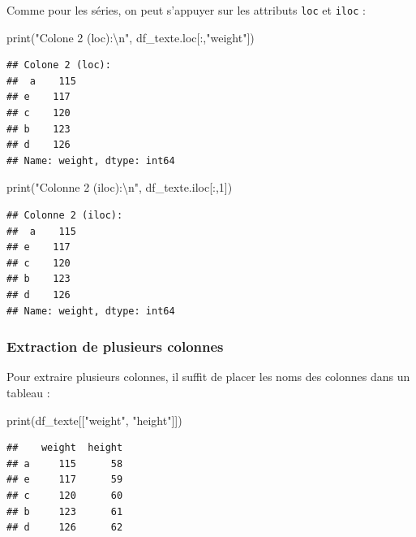 \documentclass[12pt,]{book}
\newenvironment{Shaded}{\begin{snugshade}}{\end{snugshade}}
\newcommand{\DecValTok}[1]{\textcolor[rgb]{0.00,0.00,0.81}{#1}}
\newcommand{\CharTok}[1]{\textcolor[rgb]{0.31,0.60,0.02}{#1}}
\newcommand{\StringTok}[1]{\textcolor[rgb]{0.31,0.60,0.02}{#1}}
\newcommand{\BuiltInTok}[1]{#1}
\newcommand{\NormalTok}[1]{#1}
\numberwithin{equation}{section}
\numberwithin{countremarque}{section}
\begin{document}
Comme pour les séries, on peut s'appuyer sur les attributs \texttt{loc}
et \texttt{iloc} :

\begin{Shaded}
\begin{Highlighting}[]
\BuiltInTok{print}\NormalTok{(}\StringTok{"Colone 2 (loc):}\CharTok{\textbackslash{}n}\StringTok{"}\NormalTok{, df_texte.loc[:,}\StringTok{"weight"}\NormalTok{])}
\end{Highlighting}
\end{Shaded}

\begin{lstlisting}
## Colone 2 (loc):
##  a    115
## e    117
## c    120
## b    123
## d    126
## Name: weight, dtype: int64
\end{lstlisting}

\begin{Shaded}
\begin{Highlighting}[]
\BuiltInTok{print}\NormalTok{(}\StringTok{"Colonne 2 (iloc):}\CharTok{\textbackslash{}n}\StringTok{"}\NormalTok{, df_texte.iloc[:,}\DecValTok{1}\NormalTok{])}
\end{Highlighting}
\end{Shaded}

\begin{lstlisting}
## Colonne 2 (iloc):
##  a    115
## e    117
## c    120
## b    123
## d    126
## Name: weight, dtype: int64
\end{lstlisting}

\subsubsection{Extraction de plusieurs
colonnes}\label{extraction-de-plusieurs-colonnes}

Pour extraire plusieurs colonnes, il suffit de placer les noms des
colonnes dans un tableau :

\begin{Shaded}
\begin{Highlighting}[]
\BuiltInTok{print}\NormalTok{(df_texte[[}\StringTok{"weight"}\NormalTok{, }\StringTok{"height"}\NormalTok{]])}
\end{Highlighting}
\end{Shaded}

\begin{lstlisting}
##    weight  height
## a     115      58
## e     117      59
## c     120      60
## b     123      61
## d     126      62
\end{lstlisting}
\end{document}
